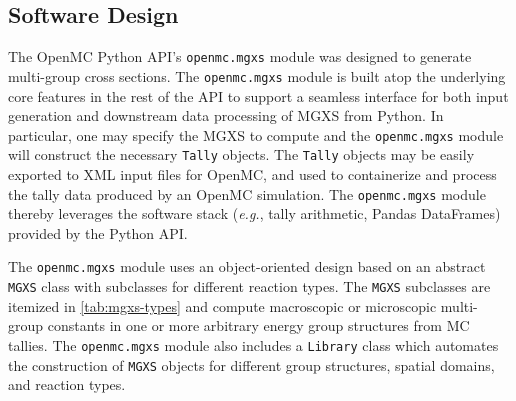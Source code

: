 \subsection{Software Design}
\label{sec:software}

The OpenMC Python API's \texttt{openmc.mgxs} module was designed to generate multi-group cross sections. The \texttt{openmc.mgxs} module is built atop the underlying core features in the rest of the API to support a seamless interface for both input generation and downstream data processing of MGXS from Python. In particular, one may specify the MGXS to compute and the \texttt{openmc.mgxs} module will construct the necessary \texttt{Tally} objects. The \texttt{Tally} objects may be easily exported to XML input files for OpenMC, and used to containerize and process the tally data produced by an OpenMC simulation. The \texttt{openmc.mgxs} module thereby leverages the software stack (\textit{e.g.}, tally arithmetic, Pandas DataFrames) provided by the Python API.

The \texttt{openmc.mgxs} module uses an object-oriented design based on an abstract \texttt{MGXS} class with subclasses for different reaction types. The \texttt{MGXS} subclasses are itemized in \cref{tab:mgxs-types} and compute macroscopic or microscopic multi-group constants in one or more arbitrary energy group structures from MC tallies. The \texttt{openmc.mgxs} module also includes a \texttt{Library} class which automates the construction of \texttt{MGXS} objects for different group structures, spatial domains, and reaction types.

